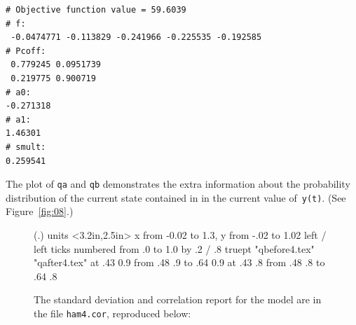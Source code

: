 \documentclass{admbmanual}
\begin{document}
\begin{lstlisting}
# Objective function value = 59.6039
# f:
 -0.0474771 -0.113829 -0.241966 -0.225535 -0.192585
# Pcoff:
 0.779245 0.0951739
 0.219775 0.900719
# a0:
-0.271318
# a1:
1.46301
# smult:
0.259541
\end{lstlisting}

The plot of \texttt{qa} and \texttt{qb} demonstrates the extra information 
about the probability distribution of the current state contained in
in the current value of~\texttt{y(t)}.  (See Figure~\ref{fig:08}.)
\begin{figure}[h]
\centering\hskip1pt\beginpicture
  \setplotsymbol ({\eightrm .})
  \setcoordinatesystem units <3.2in,2.5in>
  \setplotarea x from -0.02 to 1.3, y from -.02 to 1.02 
  \axis left 
  /
  \axis left 
    ticks numbered from .0 to 1.0 by .2 
  /
\linethickness .8 truept
\setdashpattern <1pt,1pt,1pt,1pt>
{
   \color{red}
 \plot  "qbefore4.tex" 
   \color{blue}
\setdashpattern <1pt,3pt,4pt,3pt>
 \plot  "qafter4.tex" 
   \color{red}
  at .43 0.9
 \putrule from .48 .9 to .64 0.9
   \color{blue}
  at .43 .8
 \putrule from .48 .8 to .64 .8
   \color{black}
}
\endpicture
\bigskip
\medskip
\par
\raggedright
The standard deviation and correlation report for the model are 
in the file \texttt{ham4.cor}, reproduced below:\par

\end{figure}
\end{document}
